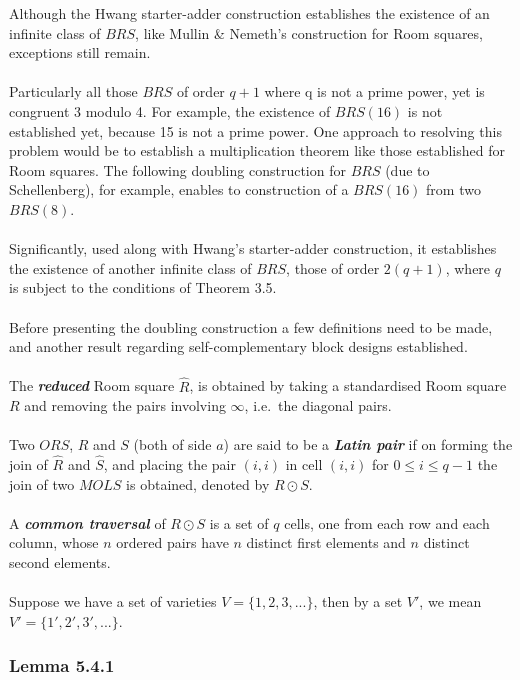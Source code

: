 \documentclass[
  11pt,
  a4paper]{book}
\begin{document}
Although the Hwang starter-adder construction establishes the existence
of an infinite class of \(BRS\), like Mullin \& Nemeth's construction for
Room squares, exceptions still remain.\\
~\\
Particularly all those \(BRS\) of order \(q+1\) where q is not a prime
power, yet is congruent 3 modulo 4. For example, the existence of
\(BRS(16)\) is not established yet, because 15 is not a prime power. One
approach to resolving this problem would be to establish a
multiplication theorem like those established for Room squares. The
following doubling construction for \(BRS\) (due to Schellenberg), for
example, enables to construction of a \(BRS(16)\) from two \(BRS(8)\).\\
~\\
Significantly, used along with Hwang's starter-adder construction, it
establishes the existence of another infinite class of \(BRS\), those of
order \(2(q+1)\), where \(q\) is subject to the conditions of Theorem 3.5.\\
~\\
Before presenting the doubling construction a few definitions need to be
made, and another result regarding self-complementary block designs
established.\\
~\\
The \textbf{\emph{reduced}} Room square \(\hat{R}\), is obtained by taking a
standardised Room square \(R\) and removing the pairs involving \(\infty\),
i.e.~the diagonal pairs.\\
~\\
Two \(ORS\), \(R\) and \(S\) (both of side \(a\)) are said to be a \textbf{\emph{Latin
pair}} if on forming the join of \(\hat{R}\) and \(\hat{S}\), and placing
the pair \((i,i)\) in cell \((i,i)\) for \(0 \leq i \leq q-1\) the join of two
\(MOLS\) is obtained, denoted by \(R \odot S\).\\
~\\
A \textbf{\emph{common traversal}} of \(R \odot S\) is a set of \(q\) cells, one from
each row and each column, whose \(n\) ordered pairs have \(n\) distinct
first elements and \(n\) distinct second elements.\\
~\\
Suppose we have a set of varieties \(V = \{1,2,3,...\}\), then by a set
\(V'\), we mean \(V'=\{1',2',3',...\}\).

\hypertarget{lemma-5.4.1}{%
\subsubsection{Lemma 5.4.1}\label{lemma-5.4.1}}
\end{document}
